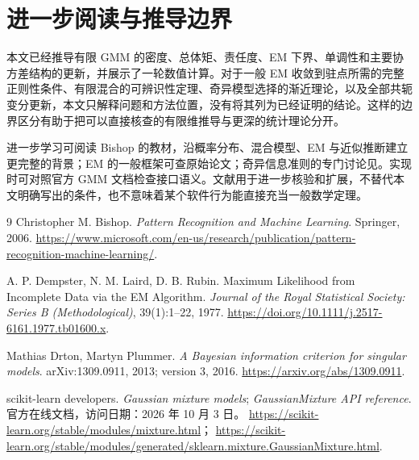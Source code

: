 \documentclass[UTF8,12pt,a4paper,fontset=fandol]{ctexart}
\begin{document}
\section{进一步阅读与推导边界}
\label{sec:gmm-reading}
本文已经推导有限 GMM 的密度、总体矩、责任度、EM 下界、单调性和主要协方差结构的更新，并展示了一轮数值计算。对于一般 EM 收敛到驻点所需的完整正则性条件、有限混合的可辨识性定理、奇异模型选择的渐近理论，以及全部共轭变分更新，本文只解释问题和方法位置，没有将其列为已经证明的结论。这样的边界区分有助于把可以直接核查的有限维推导与更深的统计理论分开。

进一步学习可阅读 Bishop 的教材\cite{bishop2006}，沿概率分布、混合模型、EM 与近似推断建立更完整的背景；EM 的一般框架可查原始论文\cite{dempster1977}；奇异信息准则的专门讨论见\cite{drton2013}。实现时可对照官方 GMM 文档\cite{sklearn-gmm}检查接口语义。文献用于进一步核验和扩展，不替代本文明确写出的条件，也不意味着某个软件行为能直接充当一般数学定理。

\begin{thebibliography}{9}
Christopher M. Bishop.
\textit{Pattern Recognition and Machine Learning}.
Springer, 2006.
\url{https://www.microsoft.com/en-us/research/publication/pattern-recognition-machine-learning/}.

A. P. Dempster, N. M. Laird, D. B. Rubin.
Maximum Likelihood from Incomplete Data via the EM Algorithm.
\textit{Journal of the Royal Statistical Society: Series B (Methodological)}, 39(1):1--22, 1977.
\url{https://doi.org/10.1111/j.2517-6161.1977.tb01600.x}.

Mathias Drton, Martyn Plummer.
\textit{A Bayesian information criterion for singular models}.
arXiv:1309.0911, 2013; version 3, 2016.
\url{https://arxiv.org/abs/1309.0911}.

scikit-learn developers.
\textit{Gaussian mixture models}; \textit{GaussianMixture API reference}.
官方在线文档，访问日期：2026 年 10 月 3 日。
\url{https://scikit-learn.org/stable/modules/mixture.html}；
\url{https://scikit-learn.org/stable/modules/generated/sklearn.mixture.GaussianMixture.html}.
\end{thebibliography}
\end{document}
